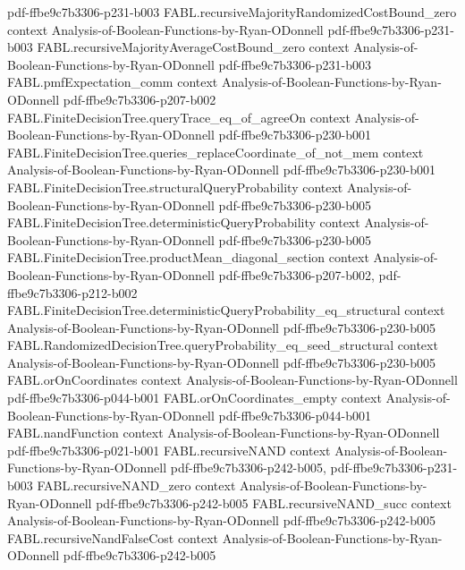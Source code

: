 \begin{theorem}
  {pdf-ffbe9c7b3306-p231-b003}
\proofstep
  {FABL.recursiveMajorityRandomizedCostBound_zero}
  {context}
  {Analysis-of-Boolean-Functions-by-Ryan-ODonnell}
  {pdf-ffbe9c7b3306-p231-b003}
\proofstep
  {FABL.recursiveMajorityAverageCostBound_zero}
  {context}
  {Analysis-of-Boolean-Functions-by-Ryan-ODonnell}
  {pdf-ffbe9c7b3306-p231-b003}
\proofstep
  {FABL.pmfExpectation_comm}
  {context}
  {Analysis-of-Boolean-Functions-by-Ryan-ODonnell}
  {pdf-ffbe9c7b3306-p207-b002}
\proofstep
  {FABL.FiniteDecisionTree.queryTrace_eq_of_agreeOn}
  {context}
  {Analysis-of-Boolean-Functions-by-Ryan-ODonnell}
  {pdf-ffbe9c7b3306-p230-b001}
\proofstep
  {FABL.FiniteDecisionTree.queries_replaceCoordinate_of_not_mem}
  {context}
  {Analysis-of-Boolean-Functions-by-Ryan-ODonnell}
  {pdf-ffbe9c7b3306-p230-b001}
\proofstep
  {FABL.FiniteDecisionTree.structuralQueryProbability}
  {context}
  {Analysis-of-Boolean-Functions-by-Ryan-ODonnell}
  {pdf-ffbe9c7b3306-p230-b005}
\proofstep
  {FABL.FiniteDecisionTree.deterministicQueryProbability}
  {context}
  {Analysis-of-Boolean-Functions-by-Ryan-ODonnell}
  {pdf-ffbe9c7b3306-p230-b005}
\proofstep
  {FABL.FiniteDecisionTree.productMean_diagonal_section}
  {context}
  {Analysis-of-Boolean-Functions-by-Ryan-ODonnell}
  {pdf-ffbe9c7b3306-p207-b002,
    pdf-ffbe9c7b3306-p212-b002}
\proofstep
  {FABL.FiniteDecisionTree.deterministicQueryProbability_eq_structural}
  {context}
  {Analysis-of-Boolean-Functions-by-Ryan-ODonnell}
  {pdf-ffbe9c7b3306-p230-b005}
\proofstep
  {FABL.RandomizedDecisionTree.queryProbability_eq_seed_structural}
  {context}
  {Analysis-of-Boolean-Functions-by-Ryan-ODonnell}
  {pdf-ffbe9c7b3306-p230-b005}
\proofstep
  {FABL.orOnCoordinates}
  {context}
  {Analysis-of-Boolean-Functions-by-Ryan-ODonnell}
  {pdf-ffbe9c7b3306-p044-b001}
\proofstep
  {FABL.orOnCoordinates_empty}
  {context}
  {Analysis-of-Boolean-Functions-by-Ryan-ODonnell}
  {pdf-ffbe9c7b3306-p044-b001}
\proofstep
  {FABL.nandFunction}
  {context}
  {Analysis-of-Boolean-Functions-by-Ryan-ODonnell}
  {pdf-ffbe9c7b3306-p021-b001}
\proofstep
  {FABL.recursiveNAND}
  {context}
  {Analysis-of-Boolean-Functions-by-Ryan-ODonnell}
  {pdf-ffbe9c7b3306-p242-b005,
    pdf-ffbe9c7b3306-p231-b003}
\proofstep
  {FABL.recursiveNAND_zero}
  {context}
  {Analysis-of-Boolean-Functions-by-Ryan-ODonnell}
  {pdf-ffbe9c7b3306-p242-b005}
\proofstep
  {FABL.recursiveNAND_succ}
  {context}
  {Analysis-of-Boolean-Functions-by-Ryan-ODonnell}
  {pdf-ffbe9c7b3306-p242-b005}
\proofstep
  {FABL.recursiveNandFalseCost}
  {context}
  {Analysis-of-Boolean-Functions-by-Ryan-ODonnell}
  {pdf-ffbe9c7b3306-p242-b005}

\end{theorem}
